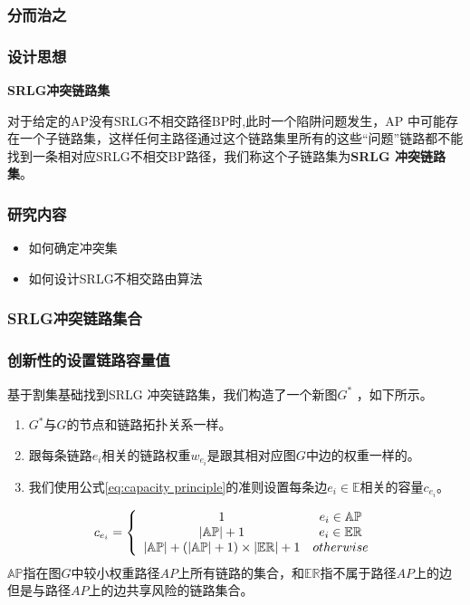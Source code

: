 \subsubsection{分而治之}
\begin{frame}
\frametitle{设计思想}
\textbf{SRLG冲突链路集}

对于给定的AP没有SRLG不相交路径BP时,此时一个陷阱问题发生，AP 中可能存在一个子链路集，这样任何主路径通过这个链路集里所有的这些“问题”链路都不能找到一条相对应SRLG不相交BP路径，我们称这个子链路集为\textbf{SRLG 冲突链路集}。
\end{frame}
\begin{frame}
\frametitle{研究内容}
\begin{itemize}
  \item 如何确定冲突集
  \item 如何设计SRLG不相交路由算法
\end{itemize}
\end{frame}


\subsubsection{SRLG冲突链路集合}
\begin{frame}
\frametitle{创新性的设置链路容量值}
基于割集基础找到SRLG 冲突链路集，我们构造了一个新图$G^*$ ，如下所示。
\begin{enumerate}
  \item $G^*$与$G$的节点和链路拓扑关系一样。
  \item 跟每条链路$e_i$相关的链路权重$w_{e_i}$是跟其相对应图$G$中边的权重一样的。
  \item 我们使用公式\ref{eq:capacity principle}的准则设置每条边$e_i \in \mathbb{E}$相关的容量$c_{e_i}$。
\end{enumerate}
\begin{equation}
c_{e_i} = \left\{ {\begin{array}{*{20}{c}}
   1 & {e_i{\rm{ }} \in {\rm{ \mathbb{AP}}}}  \\
   {\left| \mathbb{AP} \right|+1} & {e_i{\rm{ }} \in {\rm{ \mathbb{E}}}{{\rm{\mathbb{R}}}}}  \\
   {\left| {{\rm\mathbb{AP}}} \right| + \left( {\left| {{\rm\mathbb{AP}}} \right| + 1} \right)\times \left| {{\rm{\mathbb{E}}}{{\rm{\mathbb{R}}}}} \right| + 1} & {otherwise}  \\
\end{array}} \right.
\label{eq:capacity principle}
\end{equation}
$\mathbb{AP}$指在图$G$中较小权重路径$AP$上所有链路的集合，和$\mathbb{\mathbb{ER}}$指不属于路径$AP$上的边但是与路径$AP$上的边共享风险的链路集合。
\end{frame}


